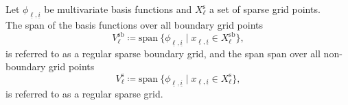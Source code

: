 \documentclass[
  a4paper,  %
  twoside,  %
  bibliography=totoc,
  headsepline,
  cleardoublepage=empty,
  parskip=half,
  draft=false
]{scrbook}
\begin{document}
\begin{definition}
Let $\phi_{\underline{\ell},\underline{i}}$ be multivariate basis functions and $X^{\text{s}}_{\ell}$ a set of sparse grid points.\\
The span of the basis functions over all boundary grid points
\begin{equation}
V^{\text{sb}}_{\ell} \coloneqq \text{span}~ \{\phi_{\underline{\ell},\underline{i}} \mid x_{\underline{\ell},\underline{i}} \in X^{\text{sb}}_{\ell}\},
\end{equation}
is referred to as a regular sparse boundary grid, and the span span over all non-boundary grid points
\begin{equation}
V^{\text{s}}_{\ell} \coloneqq \text{span}~ \{\phi_{\underline{\ell},\underline{i}} \mid x_{\underline{\ell},\underline{i}} \in X^{\text{s}}_{\ell}\},
\end{equation}
is referred to as a regular sparse grid.
\label{def:sparse_grid}
\end{definition}
\end{document}
